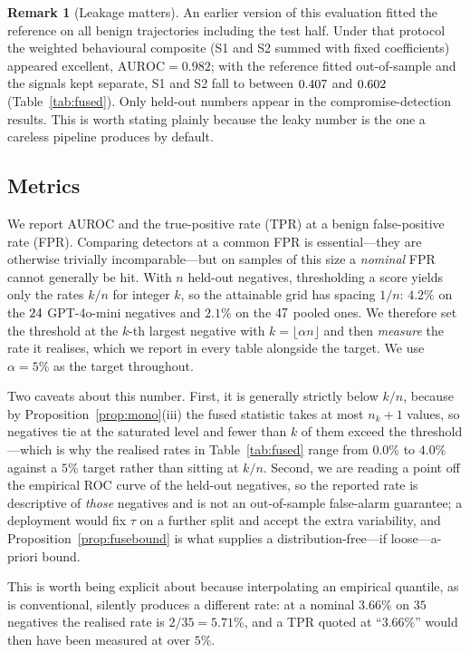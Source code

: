 \documentclass[preprint,12pt,authoryear]{elsarticle}
\theoremstyle{definition}
\newtheorem{remark}{Remark}
\begin{document}
\begin{remark}[Leakage matters]
An earlier version of this evaluation fitted the reference on all benign
trajectories including the test half. Under that protocol the weighted behavioural
composite (S1 and S2 summed with fixed coefficients) appeared excellent,
$\mathrm{AUROC} = 0.982$; with the reference fitted out-of-sample and the signals
kept separate, S1 and S2 fall to between $0.407$ and $0.602$
(Table~\ref{tab:fused}). Only held-out numbers appear in the compromise-detection
results.
This is worth stating plainly because the leaky number is the one a careless
pipeline produces by default.
\end{remark}

\subsection{Metrics}\label{sec:metrics}

We report AUROC and the true-positive rate (TPR) at a benign false-positive rate
(FPR). Comparing detectors at a common FPR is essential---they are otherwise
trivially incomparable---but on samples of this size a \emph{nominal} FPR cannot
generally be hit. With $n$ held-out negatives, thresholding a score yields only
the rates $k/n$ for integer $k$, so the attainable grid has spacing $1/n$: $4.2\%$
on the $24$ GPT-4o-mini negatives and $2.1\%$ on the $47$ pooled ones. We
therefore set the threshold at the $k$-th largest negative with
$k = \lfloor \alpha n \rfloor$ and then \emph{measure} the rate it realises, which
we report in every table alongside the target. We use $\alpha = 5\%$ as the target
throughout.

Two caveats about this number. First, it is generally strictly below $k/n$, because
by Proposition~\ref{prop:mono}(iii) the fused statistic takes at most $n_k+1$
values, so negatives tie at the saturated level and fewer than $k$ of them exceed
the threshold---which is why the realised rates in Table~\ref{tab:fused} range from
$0.0\%$ to $4.0\%$ against a $5\%$ target rather than sitting at $k/n$. Second, we
are reading a point off the empirical ROC curve of the held-out negatives, so the
reported rate is descriptive of \emph{those} negatives and is not an out-of-sample
false-alarm guarantee; a deployment would fix $\tau$ on a further split and accept
the extra variability, and Proposition~\ref{prop:fusebound} is what supplies a
distribution-free---if loose---a-priori bound.

This is worth being explicit about because interpolating an empirical quantile, as
is conventional, silently produces a different rate: at a nominal $3.66\%$ on $35$
negatives the realised rate is $2/35 = 5.71\%$, and a TPR quoted at ``$3.66\%$''
would then have been measured at over $5\%$.
\end{document}
